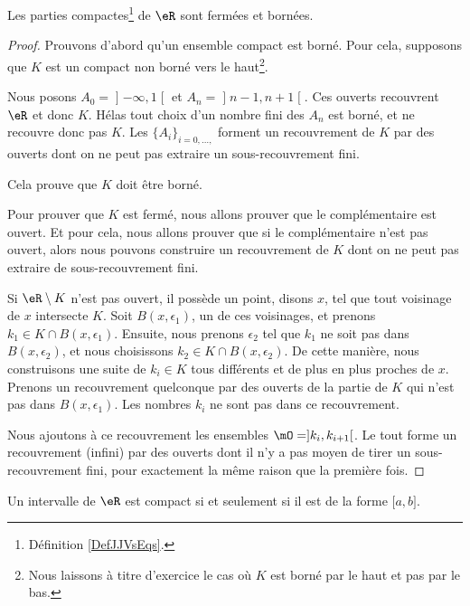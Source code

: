 \begin{proposition}     \label{PROPooBFSAooKSugMj}
	Les parties compactes\footnote{Définition \ref{DefJJVsEqs}.} de \( \eR\) sont fermées et bornées.
\end{proposition}

\begin{proof}
	Prouvons d'abord qu'un ensemble compact est borné. Pour cela, supposons que \( K\) est un compact non borné vers le haut\footnote{Nous laissons à titre d'exercice le cas où \( K\) est borné par le haut et pas par le bas.}.

	Nous posons \( A_0=\mathopen] -\infty , 1 \mathclose[\) et \( A_n=\mathopen] n-1 , n+1 \mathclose[\). Ces ouverts recouvrent \( \eR\) et donc \( K\). Hélas tout choix d'un nombre fini des \( A_n\) est borné, et ne recouvre donc pas \( K\). Les \(  \{ A_i \}_{i=0,\ldots, }  \) forment un recouvrement de \( K\) par des ouverts dont on ne peut pas extraire un sous-recouvrement fini.

	Cela prouve que \( K\) doit être borné.

	Pour prouver que \( K\) est fermé, nous allons prouver que le complémentaire est ouvert. Et pour cela, nous allons prouver que si le complémentaire n'est pas ouvert, alors nous pouvons construire un recouvrement de \( K\) dont on ne peut pas extraire de sous-recouvrement fini.

	Si \( \eR\setminus K\) n'est pas ouvert, il possède un point, disons \( x\), tel que tout voisinage de \( x\) intersecte \( K\). Soit \( B(x,\epsilon_1)\), un de ces voisinages, et prenons \( k_1\in K\cap B(x,\epsilon_1)\). Ensuite, nous prenons \( \epsilon_2\) tel que \( k_1\) ne soit pas dans \( B(x,\epsilon_2)\), et nous choisissons \( k_2\in K\cap B(x,\epsilon_2)\). De cette manière, nous construisons une suite de \( k_i\in K\) tous différents et de plus en plus proches de \( x\). Prenons un recouvrement quelconque par des ouverts de la partie de \( K\) qui n'est pas dans \( B(x,\epsilon_1)\). Les nombres \( k_i\) ne sont pas dans ce recouvrement.

	Nous ajoutons à ce recouvrement les ensembles \( \mO=]k_i,k_{i+1}[\). Le tout forme un recouvrement (infini) par des ouverts dont il n'y a pas moyen de tirer un sous-recouvrement fini, pour exactement la même raison que la première fois.
\end{proof}

\begin{theorem}   \label{ThoBOrelLebesgue}
	Un intervalle de \( \eR\) est compact si et seulement si il est de la forme \( \mathopen[ a , b \mathclose]\).
\end{theorem}

